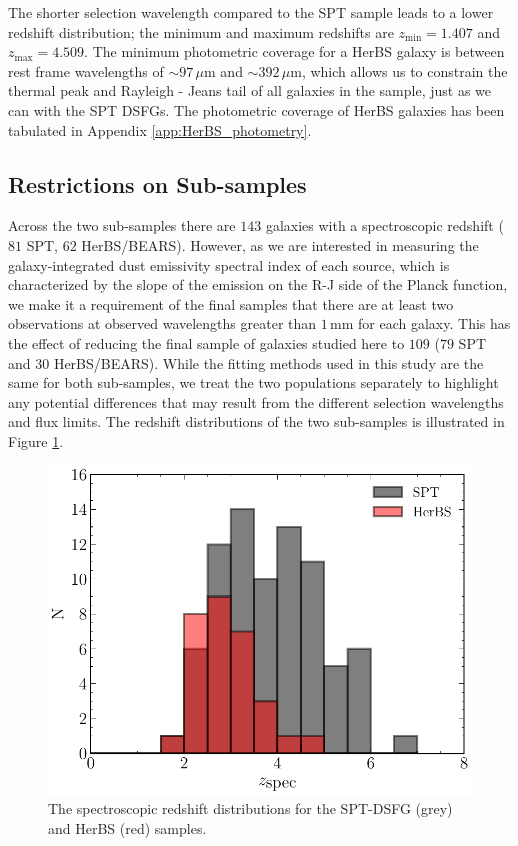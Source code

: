 The shorter selection wavelength compared to the SPT sample leads to a lower redshift distribution; the minimum and maximum redshifts are $z_{\textrm{min}} = 1.407$ and $z_{\textrm{max}} = 4.509$. The minimum photometric coverage for a HerBS galaxy is between rest frame wavelengths of $\sim 97\,\mu$m and $\sim 392\,\mu$m, which allows us to constrain the thermal peak and Rayleigh - Jeans tail of all galaxies in the sample, just as we can with the SPT DSFGs. The photometric coverage of HerBS galaxies has been tabulated in Appendix \ref{app:HerBS_photometry}.

\subsection{Restrictions on Sub-samples}

Across the two sub-samples there are $143$ galaxies with a spectroscopic redshift ($81$ SPT, $62$ HerBS/BEARS). However, as we are interested in measuring the galaxy-integrated dust emissivity spectral index of each source, which is characterized by the slope of the emission on the R-J side of the Planck function, we make it a requirement of the final samples that there are at least two observations at observed wavelengths greater than $1\,$mm for each galaxy. This has the effect of reducing the final sample of galaxies studied here to $109$ ($79$ SPT and $30$ HerBS/BEARS). While the fitting methods used in this study are the same for both sub-samples, we treat the two populations separately to highlight any potential differences that may result from the different selection wavelengths and flux limits. The redshift distributions of the two sub-samples is illustrated in Figure \ref{fig:spt_herbs_redshift}.

\begin{figure}
	\centering
	\includegraphics[width=0.75\columnwidth]{Figures/spt_herbs_redshift_distribution.pdf}
	\caption[Spectroscopic redshift distributions of HerBS and SPT-DSFG samples]{The spectroscopic redshift distributions for the SPT-DSFG (grey) and HerBS (red) samples.}
	\label{fig:spt_herbs_redshift}
\end{figure}

